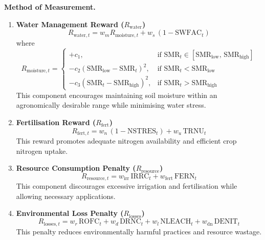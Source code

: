 \vspace{0.2cm}
\noindent\textbf{Method of Measurement.}
\begin{enumerate}
  \item \textbf{Water Management Reward ($R_{\text{water}}$)}
  \begin{equation}
  R_{\text{water},t}= w_m R_{\text{moisture},t} + w_s\,(1-\mathrm{SWFAC}_t)
  \end{equation}
  where
 \begin{equation}
R_{\text{moisture},t}=
\begin{cases}
+c_1,
& \text{if } \mathrm{SMR}_t \in [\mathrm{SMR}_{\text{low}},\,\mathrm{SMR}_{\text{high}}]
\\[2mm]
-c_2(\mathrm{SMR}_{\text{low}}-\mathrm{SMR}_t)^2,
& \text{if } \mathrm{SMR}_t < \mathrm{SMR}_{\text{low}}
\\[2mm]
-c_3(\mathrm{SMR}_t-\mathrm{SMR}_{\text{high}})^2,
& \text{if } \mathrm{SMR}_t > \mathrm{SMR}_{\text{high}}
\end{cases}
\end{equation}
  This component encourages maintaining soil moisture within an agronomically desirable
  range while minimising water stress.

  \item \textbf{Fertilisation Reward ($R_{\text{fert}}$)}
  \begin{equation}
  R_{\text{fert},t}= w_n\,(1-\mathrm{NSTRES}_t) + w_u\,\mathrm{TRNU}_t
  \end{equation}
  This reward promotes adequate nitrogen availability and efficient crop nitrogen
  uptake.

  \item \textbf{Resource Consumption Penalty ($R_{\text{resource}}$)}
  \begin{equation}
  R_{\text{resource},t}= w_{\text{irr}}\,\mathrm{IRRC}_t + w_{\text{fert}}\,\mathrm{FERN}_t
  \end{equation}
  This component discourages excessive irrigation and fertilisation while allowing
  necessary applications.

  \item \textbf{Environmental Loss Penalty ($R_{\text{losses}}$)}
  \begin{equation}
  R_{\text{losses},t}= w_r\,\mathrm{ROFC}_t + w_d\,\mathrm{DRNC}_t + w_l\,\mathrm{NLEACH}_t + w_{\text{dn}}\,\mathrm{DENIT}_t
  \end{equation}
  This penalty reduces environmentally harmful practices and resource wastage.
\end{enumerate}

